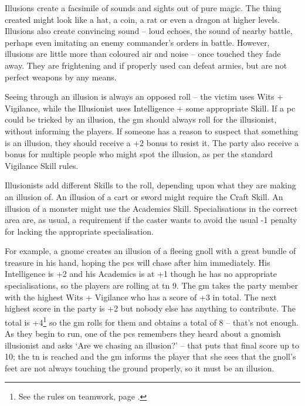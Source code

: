 
\begin{multicols}{2}

\noindent
Illusions create a facsimile of sounds and sights out of pure magic. The thing created might look like a hat, a coin, a rat or even a dragon at higher levels. Illusions also create convincing sound -- loud echoes, the sound of nearby battle, perhaps even imitating an enemy commander's orders in battle. However, illusions are little more than coloured air and noise -- once touched they fade away. They are frightening and if properly used can defeat armies, but are not perfect weapons by any means.

Seeing through an illusion is always an opposed roll -- the victim uses Wits + Vigilance, while the Illusionist uses Intelligence + some appropriate Skill.
If a \gls{pc} could be tricked by an illusion, the \gls{gm} should always roll for the illusionist, without informing the players.
If someone has a reason to suspect that something is an illusion, they should receive a +2 bonus to resist it.
The party also receive a bonus for multiple people who might spot the illusion, as per the standard Vigilance Skill rules.

Illusionists add different Skills to the roll, depending upon what they are making an illusion of. An illusion of a cart or sword might require the Craft Skill. An illusion of a monster might use the Academics Skill. Specialisations in the correct area are, as usual, a requirement if the caster wants to avoid the usual -1 penalty for lacking the appropriate specialisation.

For example, a gnome creates an illusion of a fleeing gnoll with a great bundle of treasure in his hand, hoping the \glspl{pc} will chase after him immediately.
His Intelligence is +2 and his Academics is at +1 though he has no appropriate specialisations, so the players are rolling at \gls{tn} 9.
The \gls{gm} takes the party member with the highest Wits + Vigilance who has a score of +3 in total.
The next highest score in the party is +2 but nobody else has anything to contribute.
The total is +4\footnote{See the rules on teamwork, page \pageref{teamwork}.} so the \gls{gm} rolls for them and obtains a total of 8 -- that's not enough.
As they begin to run, one of the \glspl{pc} remembers they heard about a gnomish illusionist and asks `Are we chasing an illusion?' -- that puts that final score up to 10; the \gls{tn} is reached and the \gls{gm} informs the player that she sees that the gnoll's feet are not always touching the ground properly, so it must be an illusion.


\end{multicols}

